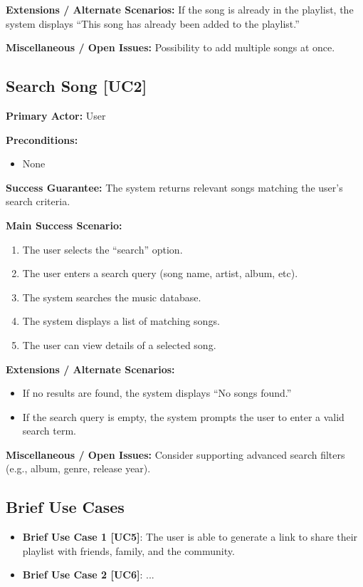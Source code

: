 \documentclass{article}
\begin{document}
\textbf{Extensions / Alternate Scenarios:}  
If the song is already in the playlist, the system displays ``This song has already been added to the playlist.''

\textbf{Miscellaneous / Open Issues:}  
Possibility to add multiple songs at once.

\subsection{Search Song [UC2]}
\textbf{Primary Actor:} User

\textbf{Preconditions:}
\begin{itemize}
  \item None
\end{itemize}

\textbf{Success Guarantee:}  
The system returns relevant songs matching the user’s search criteria.

\textbf{Main Success Scenario:}
\begin{enumerate}
  \item The user selects the ``search'' option.
  \item The user enters a search query (song name, artist, album, etc).
  \item The system searches the music database.
  \item The system displays a list of matching songs.
  \item The user can view details of a selected song.
\end{enumerate}

\textbf{Extensions / Alternate Scenarios:}
\begin{itemize}
  \item If no results are found, the system displays ``No songs found.''
  \item If the search query is empty, the system prompts the user to enter a valid search term.
\end{itemize}

\textbf{Miscellaneous / Open Issues:}  
Consider supporting advanced search filters (e.g., album, genre, release year).

\subsection{Brief Use Cases}

\begin{itemize}
    \item{\textbf{Brief Use Case 1 [UC5]}: The user is able to generate a link to share their playlist with friends, family, and the community.}
    \item{\textbf{Brief Use Case 2 [UC6]}: ...}
\end{itemize}
\end{document}
